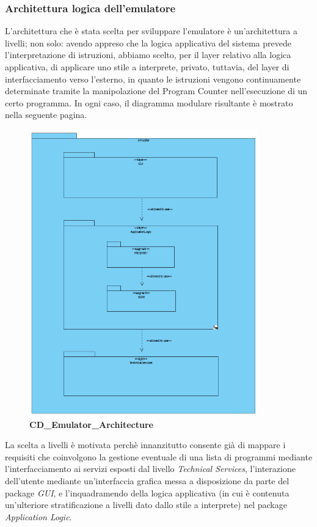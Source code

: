 \documentclass[11pt]{article}
\begin{document}
\subsubsection{Architettura logica dell'emulatore}
L'architettura che è stata scelta per sviluppare l'emulatore è un'architettura a livelli; non solo: avendo appreso che la logica applicativa del sistema prevede l'interpretazione di istruzioni, abbiamo scelto, per il layer relativo alla logica applicativa, di applicare uno stile a interprete, privato, tuttavia, del layer di interfacciamento verso l'esterno, in quanto le istruzioni vengono continuamente determinate tramite la manipolazione del Program Counter nell'esecuzione di un certo programma. In ogni caso, il diagramma modulare risultante è mostrato nella seguente pagina.
\begin{figure}[t]
\centering
\includegraphics[width=375px, height=468px]{CD_Emulator_Architecture.png}\\
\small\textbf{CD\_Emulator\_Architecture}
\end{figure}
\clearpage
La scelta a livelli è motivata perchè innanzitutto consente già di mappare i requisiti che coinvolgono la gestione eventuale di una lista di programmi mediante l'interfacciamento ai servizi esposti dal livello \emph{Technical Services}, l'interazione dell'utente mediante un'interfaccia grafica messa a disposizione da parte del package \emph{GUI}, e l'inquadramendo della logica applicativa (in cui è contenuta un'ulteriore stratificazione a livelli dato dallo stile a interprete) nel package \emph{Application Logic}.\\
\end{document}
